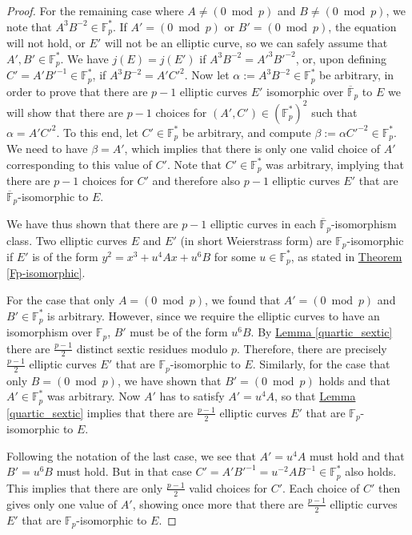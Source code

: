 \documentclass[openany, a4paper, 10pt]{book}
\theoremstyle{plain}
\theoremstyle{plain}
\theoremstyle{plain}
\theoremstyle{definition}
\theoremstyle{plain}
\theoremstyle{definition}
\theoremstyle{remark}
\newcommand{\theoref}[1]{\hyperref[#1]{Theorem \ref{#1}}}
\newcommand{\lemref}[1]{\hyperref[#1]{Lemma \ref{#1}}}
\begin{document}
\begin{proof}
    For the remaining case where $A\neq (0 \bmod p)$ and $B \neq (0 \bmod p)$, we note that $A^3B^{-2} \in \mathbb F_p^*$.
    If $A'=(0 \bmod p)$ or $B'=(0 \bmod p)$, the equation will not hold, or $E'$ will not be an elliptic curve, so we can safely assume that $A',B' \in \mathbb F_p^*$.
    We have $j(E) = j(E')$ if $A^3B^{-2} = A'^3B'^{-2}$, or, upon defining $C' = A'B'^{-1} \in \mathbb F_p^*$, if $A^3B^{-2} = A'C'^2$.
    Now let $\alpha:=A^3B^{-2} \in \mathbb F_p^*$ be arbitrary, in order to prove that there are $p-1$ elliptic curves $E'$ isomorphic over $\overline{\mathbb F}_p$ to $E$ we will show that there are $p-1$ choices for $(A',C')\in (\mathbb F_p^*)^2$ such that $\alpha=A'C'^2$.
    To this end, let $C' \in \mathbb F_p^*$ be arbitrary, and compute $\beta := \alpha C'^{-2} \in \mathbb F_p^*$.
    We need to have $\beta = A'$, which implies that there is only one valid choice of $A'$ corresponding to this value of $C'$.
    Note that $C' \in \mathbb F_p^*$ was arbitrary, implying that there are $p-1$ choices for $C'$ and therefore also $p-1$ elliptic curves $E'$ that are $\overline {\mathbb F}_p$-isomorphic to $E$.

    We have thus shown that there are $p-1$ elliptic curves in each $\overline{\mathbb F}_p$-isomorphism class.
    Two elliptic curves $E$ and $E'$ (in short Weierstrass form) are $\mathbb F_p$-isomorphic if $E'$ is of the form $y^2 = x^3 + u^4Ax + u^6B$ for some $u \in \mathbb F_p^*$, as stated in \theoref{Fp-isomorphic}.

    For the case that only $A=(0 \bmod p)$, we found that $A'=(0 \bmod p)$ and $B' \in \mathbb F_p^*$ is arbitrary.
    However, since we require the elliptic curves to have an isomorphism over $\mathbb F_p$, $B'$ must be of the form $u^6B$.
    By \lemref{quartic_sextic} there are $\frac{p-1}{2}$ distinct sextic residues modulo $p$.
    Therefore, there are precisely $\frac{p-1}{2}$ elliptic curves $E'$ that are $\mathbb F_p$-isomorphic to $E$.
    Similarly, for the case that only $B=(0 \bmod p)$, we have shown that $B'=(0 \bmod p)$ holds and that $A' \in \mathbb F_p^*$ was arbitrary.
    Now $A'$ has to satisfy $A' = u^4A$, so that \lemref{quartic_sextic} implies that there are $\frac{p-1}{2}$ elliptic curves $E'$ that are $\mathbb F_p$-isomorphic to $E$.

    Following the notation of the last case, we see that $A'=u^4A$ must hold and that $B' = u^6B$ must hold.
    But in that case $C' = A'B'^{-1} = u^{-2}AB^{-1} \in \mathbb F_p^*$ also holds.
    This implies that there are only $\frac{p-1}{2}$ valid choices for $C'$.
    Each choice of $C'$ then gives only one value of $A'$, showing once more that there are $\frac{p-1}{2}$ elliptic curves $E'$ that are $\mathbb F_p$-isomorphic to $E$.
\end{proof}
\end{document}
